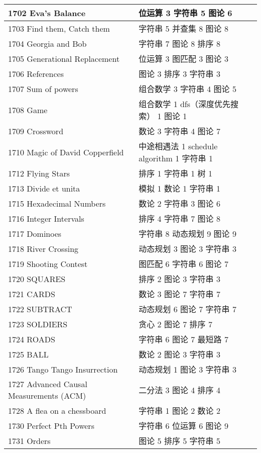 \begin{longtable}{| p{} | p{} |}
 1702 Eva's Balance  & 位运算 3 字符串 5 图论 6 \\ \hline
 1703 Find them, Catch them  & 字符串 5 并查集 8 图论 8 \\ \hline
 1704 Georgia and Bob  & 字符串 7 图论 8 排序 8 \\ \hline
 1705 Generational Replacement  & 位运算 3 图匹配 3 图论 3 \\ \hline
 1706 References  & 图论 3 排序 3 字符串 3 \\ \hline
 1707 Sum of powers  & 组合数学 3 字符串 4 图论 5 \\ \hline
 1708 Game  & 组合数学 1 dfs（深度优先搜索） 1 图论 1 \\ \hline
 1709 Crossword  & 数论 3 字符串 4 图论 7 \\ \hline
 1710 Magic of David Copperfield  & 中途相遇法 1 schedule algorithm 1 字符串 1 \\ \hline
 1712 Flying Stars  & 排序 1 字符串 1 树 1 \\ \hline
 1713 Divide et unita  & 模拟 1 数论 1 字符串 1 \\ \hline
 1715 Hexadecimal Numbers  & 数论 2 字符串 3 图论 6 \\ \hline
 1716 Integer Intervals  & 排序 4 字符串 7 图论 8 \\ \hline
 1717 Dominoes  & 字符串 8 动态规划 9 图论 9 \\ \hline
 1718 River Crossing  & 动态规划 3 图论 3 字符串 3 \\ \hline
 1719 Shooting Contest  & 图匹配 6 字符串 6 图论 7 \\ \hline
 1720 SQUARES  & 排序 2 图论 3 字符串 3 \\ \hline
 1721 CARDS  & 数论 3 图论 7 字符串 7 \\ \hline
 1722 SUBTRACT  & 动态规划 6 图论 7 字符串 7 \\ \hline
 1723 SOLDIERS  & 贪心 2 图论 7 排序 7 \\ \hline
 1724 ROADS  & 字符串 6 图论 7 最短路 7 \\ \hline
 1725 BALL  & 数论 2 图论 3 字符串 3 \\ \hline
 1726 Tango Tango Insurrection  & 动态规划 1 图论 3 字符串 3 \\ \hline
 1727 Advanced Causal Measurements (ACM)  & 二分法 3 图论 4 排序 4 \\ \hline
 1728 A flea on a chessboard  & 字符串 1 图论 2 数论 2 \\ \hline
 1730 Perfect Pth Powers  & 字符串 6 位运算 6 图论 9 \\ \hline
 1731 Orders  & 图论 5 排序 5 字符串 5 \\ \hline

\end{longtable}

